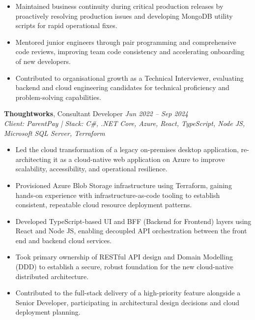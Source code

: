 \documentclass[a4paper,10pt]{article}
\begin{document}
\begin{itemize}[leftmargin=1.5em, itemsep=0.01em]
  \item Maintained business continuity during critical production releases by proactively resolving production issues and developing MongoDB utility scripts for rapid operational fixes.
  \item Mentored junior engineers through pair programming and comprehensive code reviews, improving team code consistency and accelerating onboarding of new developers.
  \item Contributed to organisational growth as a Technical Interviewer, evaluating backend and cloud engineering candidates for technical proficiency and problem-solving capabilities.
\end{itemize}

\textbf{Thoughtworks}, Consultant Developer \hfill \textit{Jun 2022 -- Sep 2024}\\
\textit{Client: ParentPay | Stack: C\#, .NET Core, Azure, React, TypeScript, Node JS, Microsoft SQL Server, Terraform}
\begin{itemize}[leftmargin=1.5em, itemsep=0.01em]
  \item Led the cloud transformation of a legacy on-premises desktop application, re-architecting it as a cloud-native web application on Azure to improve scalability, accessibility, and operational resilience.
  \item Provisioned Azure Blob Storage infrastructure using Terraform, gaining hands-on experience with infrastructure-as-code tooling to establish consistent, repeatable cloud resource deployment patterns.
  \item Developed TypeScript-based UI and BFF (Backend for Frontend) layers using React and Node JS, enabling decoupled API orchestration between the front end and backend cloud services.
  \item Took primary ownership of RESTful API design and Domain Modelling (DDD) to establish a secure, robust foundation for the new cloud-native distributed architecture.
  \item Contributed to the full-stack delivery of a high-priority feature alongside a Senior Developer, participating in architectural design decisions and cloud deployment planning.
\end{itemize}
\end{document}
